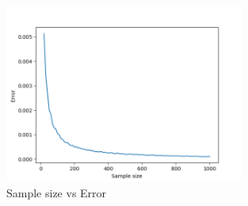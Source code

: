 \documentclass[11pt, a4paper]{article}
\theoremstyle{definition}
\begin{document}
			\begin{figure}[H]
			\begin{minipage}{1.0\textwidth}
				\centering
				\includegraphics[width=0.7\textwidth]{"Error vs sample size 4"}
				\caption{Sample size vs Error}\label{Fig:Data5}
			\end{minipage}
			\end{figure}	
\end{document}
